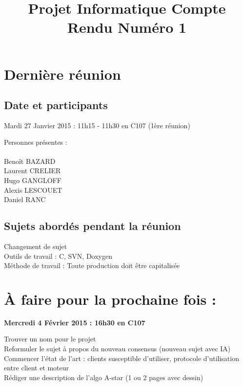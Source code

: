 \documentclass[a4paper,11pt]{article}
\title{Projet Informatique Compte Rendu Numéro 1}
\date{}
\begin{document}
\maketitle

\section{Dernière réunion}

\subsection{Date et participants}

Mardi 27 Janvier 2015 : 11h15 - 11h30 en C107 (1ère réunion)

Personnes présentes :\\
\\
  Benoît BAZARD\\
  Laurent CRELIER\\
  Hugo GANGLOFF\\
  Alexis LESCOUET\\
  Daniel RANC\\

\subsection{Sujets abordés pendant la réunion}

Changement de sujet\\
Outils de travail : C, SVN, Doxygen\\
Méthode de travail : Toute production doit être capitalisée\\

\section{À faire pour la prochaine fois :}

\textbf{Mercredi 4 Février 2015 : 16h30 en C107}
\medskip

Trouver un nom pour le projet\\
Reformuler le sujet à propos du nouveau consensus (nouveau sujet avec IA)\\
Commencer l'état de l'art : clients susceptible d'utiliser, protocole d'utilisation entre client et moteur\\
Rédiger une description de l'algo A-star (1 ou 2 pages avec dessin)\\
\end{document}
